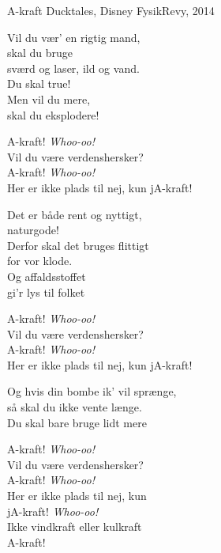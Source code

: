 \begin{song}{A-kraft}
  {} %
  {Ducktales, Disney} %
  {} %
  {FysikRevy, 2014} %
  {\NotCCLIed} %

  \begin{SBVerse}
    Vil du vær' en rigtig mand,\\
    skal du bruge\\
    sværd og laser, ild og vand.\\
    Du skal true!\\
    Men vil du mere,\\
    skal du eksplodere!
  \end{SBVerse}

  \begin{SBChorus}
    A-kraft! \emph{Whoo-oo!}\\
    Vil du være verdenshersker?\\
    A-kraft! \emph{Whoo-oo!}\\
    Her er ikke plads til nej, kun jA-kraft!
  \end{SBChorus}

  \begin{SBVerse}
    Det er både rent og nyttigt,\\
    naturgode!\\
    Derfor skal det bruges flittigt\\
    for vor klode.\\
    Og affaldsstoffet\\
    gi'r lys til folket
  \end{SBVerse}

  \begin{SBChorus}
    A-kraft! \emph{Whoo-oo!}\\
    Vil du være verdenshersker?\\
    A-kraft! \emph{Whoo-oo!}\\
    Her er ikke plads til nej, kun jA-kraft!
  \end{SBChorus}

  \begin{SBSection*}
    Og hvis din bombe ik' vil sprænge,\\
    så skal du ikke vente længe.\\
    Du skal bare bruge lidt mere
  \end{SBSection*}

  \begin{SBChorus}
    A-kraft! \emph{Whoo-oo!}\\
    Vil du være verdenshersker?\\
    A-kraft! \emph{Whoo-oo!}\\
    Her er ikke plads til nej, kun\\
    jA-kraft! \emph{Whoo-oo!}\\
    Ikke vindkraft eller kulkraft\\
    A-kraft!
  \end{SBChorus}
\end{song}
